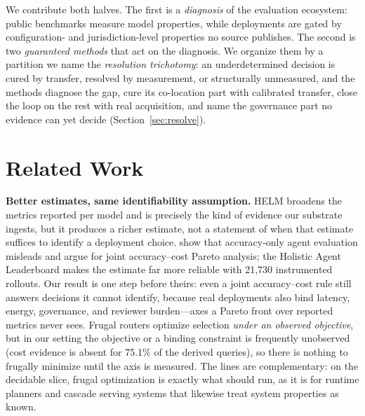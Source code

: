 \documentclass{article} %
\begin{document}
We contribute both halves. The first is a \emph{diagnosis} of the evaluation ecosystem: public benchmarks measure model properties, while deployments are gated by configuration- and jurisdiction-level properties no source publishes. The second is two \emph{guaranteed methods} that act on the diagnosis. We organize them by a partition we name the \emph{resolution trichotomy}: an underdetermined decision is cured by transfer, resolved by measurement, or structurally unmeasured, and the methods diagnose the gap, cure its co-location part with calibrated transfer, close the loop on the rest with real acquisition, and name the governance part no evidence can yet decide (Section~\ref{sec:resolve}).

\section{Related Work}
\label{sec:related}

\textbf{Better estimates, same identifiability assumption.}
HELM \citep{liang2022helm} broadens the metrics reported per model and is precisely the kind of evidence our substrate ingests, but it produces a richer estimate, not a statement of when that estimate suffices to identify a deployment choice. \citet{kapoor2024agents} show that accuracy-only agent evaluation misleads and argue for joint accuracy--cost Pareto analysis; the Holistic Agent Leaderboard \citep{stroebl2025hal} makes the estimate far more reliable with 21{,}730 instrumented rollouts. Our result is one step before theirs: even a joint accuracy--cost rule still answers decisions it cannot identify, because real deployments also bind latency, energy, governance, and reviewer burden---axes a Pareto front over reported metrics never sees. Frugal routers \citep{chen2023frugalgpt,hu2024routerbench,ong2024routellm,chen2025llmselector} optimize selection \emph{under an observed objective}, but in our setting the objective or a binding constraint is frequently unobserved (cost evidence is absent for 75.1\% of the derived queries), so there is nothing to frugally minimize until the axis is measured. The lines are complementary: on the decidable slice, frugal optimization is exactly what should run, as it is for runtime planners and cascade serving systems \citep{circinus2025,cascadia2025} that likewise treat system properties as known.
\end{document}
